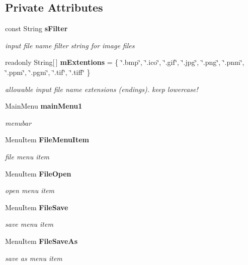 \subsection*{Private Attributes}
\begin{CompactItemize}
\item 
const String {\bf s\-Filter}
\begin{CompactList}\small\item\em input file name filter string for image files \item\end{CompactList}\item 
readonly String[$\,$] {\bf m\-Extentions} = \{ \char`\"{}.bmp\char`\"{}, \char`\"{}.ico\char`\"{}, \char`\"{}.gif\char`\"{}, \char`\"{}.jpg\char`\"{}, \char`\"{}.png\char`\"{}, \char`\"{}.pnm\char`\"{}, \char`\"{}.ppm\char`\"{}, \char`\"{}.pgm\char`\"{}, \char`\"{}.tif\char`\"{}, \char`\"{}.tiff\char`\"{} \}
\begin{CompactList}\small\item\em allowable input file name extensions (endings). keep lowercase! \item\end{CompactList}\item 
Main\-Menu {\bf main\-Menu1}
\begin{CompactList}\small\item\em menubar \item\end{CompactList}\item 
Menu\-Item {\bf File\-Menu\-Item}
\begin{CompactList}\small\item\em file menu item \item\end{CompactList}\item 
Menu\-Item {\bf File\-Open}
\begin{CompactList}\small\item\em open menu item \item\end{CompactList}\item 
Menu\-Item {\bf File\-Save}
\begin{CompactList}\small\item\em save menu item \item\end{CompactList}\item 
Menu\-Item {\bf File\-Save\-As}
\begin{CompactList}\small\item\em save as menu item \item\end{CompactList}\item 

\end{CompactItemize}

